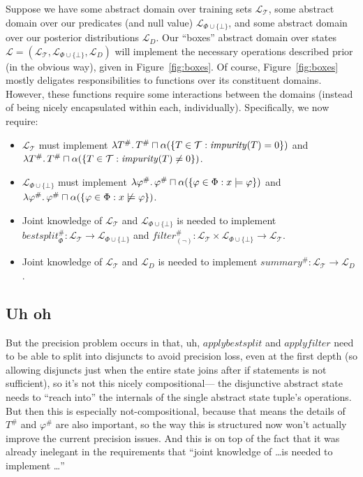 Suppose we have some abstract domain over training sets $\mathcal{L}_\mathcal{T}$,
some abstract domain over our predicates (and null value) $\mathcal{L}_{\Phi \cup \{\bot\}}$,
and some abstract domain over our posterior distributions $\mathcal{L}_D$.
Our ``boxes'' abstract domain over states
$\mathcal{L} = (\mathcal{L}_\mathcal{T}, \mathcal{L}_{\Phi \cup \{\bot\}}, \mathcal{L}_D)$
will implement the necessary operations described prior (in the obvious way),
given in Figure~\ref{fig:boxes}.
Of course, Figure~\ref{fig:boxes} mostly deligates responsibilities
to functions over its constituent domains.
However, these functions require some interactions between the domains
(instead of being nicely encapsulated within each, individually).
Specifically, we now require:
\begin{itemize}
    \item $\mathcal{L}_\mathcal{T}$ must implement
        $\lambda T^\# \ldotp T^\# \sqcap
        \alpha(\{T \in \mathcal{T} : \mathit{impurity}(T) = 0\})$
        and
        $\lambda T^\# \ldotp T^\# \sqcap
        \alpha(\{T \in \mathcal{T} : \mathit{impurity}(T) \neq 0\})$.
    \item $\mathcal{L}_{\Phi \cup \{\bot\}}$ must implement
        $\lambda \varphi^\# \ldotp \varphi^\# \sqcap
        \alpha(\{\varphi \in \Phi : x \models \varphi\})$
        and
        $\lambda \varphi^\# \ldotp \varphi^\# \sqcap
        \alpha(\{\varphi \in \Phi : x \not\models \varphi\})$.
    \item Joint knowledge of $\mathcal{L}_\mathcal{T}$ and
        $\mathcal{L}_{\Phi \cup \{\bot\}}$ is needed to implement
        $\mathit{bestsplit}^\#_\Phi : \mathcal{L}_\mathcal{T} \rightarrow
        \mathcal{L}_{\Phi \cup \{\bot\}}$ and
        $\mathit{filter}^\#_{(\lnot)} :
        \mathcal{L}_\mathcal{T} \times \mathcal{L}_{\Phi\cup\{\bot\}}
        \rightarrow \mathcal{L}_\mathcal{T}$.
    \item Joint knowledge of $\mathcal{L}_\mathcal{T}$ and $\mathcal{L}_D$
        is needed to implement
        $\mathit{summary}^\# : \mathcal{L}_\mathcal{T} \rightarrow \mathcal{L}_D$.
\end{itemize}

\subsection{Uh oh}
But the precision problem occurs in that, uh, $\mathit{applybestsplit}$ and $\mathit{applyfilter}$
need to be able to split into disjuncts to avoid precision loss, even at the first depth
(so allowing disjuncts just when the entire state joins after if statements is not sufficient),
so it's not this nicely compositional---%
the disjunctive abstract state needs to ``reach into'' the internals of the
single abstract state tuple's operations.
But then this is especially not-compositional,
because that means the details of $T^\#$ and $\varphi^\#$ are also important,
so the way this is structured now won't actually improve the current precision issues.
And this is on top of the fact that it was already inelegant in the requirements that
``joint knowledge of \ldots is needed to implement \ldots''
